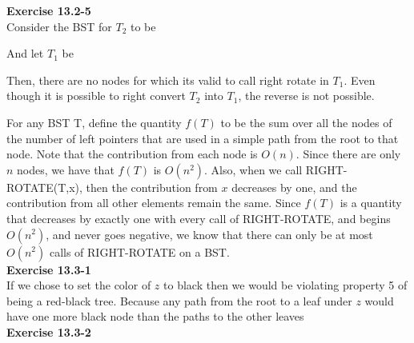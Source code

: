 \documentclass{article}
\begin{document}
\noindent\textbf{ Exercise 13.2-5} \\

Consider the BST for $T_2$ to be


And let $T_1$ be 


Then, there are no nodes for which its valid to call right rotate in $T_1$. Even though it is possible to right convert $T_2$ into $T_1$, the reverse is not possible.


For any BST T, define the quantity $f(T)$ to be the sum over all the nodes of the number of left pointers that are used in a simple path from the root to that node. Note that the contribution from each node is $O(n)$. Since there are only $n$ nodes, we have that $f(T)$ is $O(n^2)$. Also, when we call RIGHT-ROTATE(T,x), then the contribution from $x$ decreases by one, and the contribution from all other elements remain the same. Since $f(T)$ is a quantity that decreases by exactly one with every call of RIGHT-ROTATE, and begins $O(n^2)$, and never goes negative, we know that there can only be at most $O(n^2)$ calls of RIGHT-ROTATE on a BST.\\



\noindent\textbf{ Exercise 13.3-1} \\

If we chose to set the color of $z$ to black then we would be violating property 5 of being a red-black tree. Because any path from the root to a leaf under $z$ would have one more black node than the paths to the other leaves \\

\noindent\textbf{Exercise 13.3-2}\\
\end{document}
